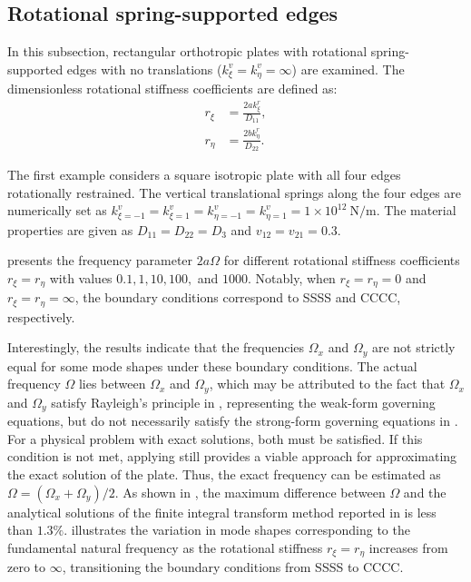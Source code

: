 \documentclass[preprint,12pt,number]{elsarticle}
\newcommand{\ustif}{~\unit{\newton\per\metre}\xspace}
\begin{document}
\subsection{Rotational spring-supported edges}\label{sec:Rotational spring-supported}
In this subsection, rectangular orthotropic plates with rotational spring-supported edges with no translations ($k^v_\xi = k^v_\eta = \infty$) are examined.  
The dimensionless rotational stiffness coefficients are defined as: 
% 
\begin{subequations}\label{eq:rotation_coex}
\begin{align}
	r_{\xi} &= \frac{2a k^r_{\xi}}{D_{11}}, \\
	r_{\eta} &= \frac{2b k^r_{\eta}}{D_{22}}.
\end{align}
\end{subequations}

The first example considers a square isotropic plate with all four edges rotationally restrained. 
The vertical translational springs along the four edges are numerically set as $ k^v_{\xi=-1} = k^v_{\xi=1} = k^v_{\eta=-1} = k^v_{\eta=1} = 1 \times 10^{12} \ustif $. 
The material properties are given as $ D_{11} = D_{22} = D_3 $ and $ v_{12} = v_{21} = 0.3 $.  

 presents the frequency parameter $2a\Omega $ for different rotational stiffness coefficients  $ r_{\xi} = r_{\eta} $ with values $ 0.1, 1, 10, 100, $ and $ 1000$.  
Notably, when $ r_{\xi} = r_{\eta} = 0 $ and $r_{\xi} = r_{\eta} = \infty$, the boundary conditions correspond to SSSS and CCCC, respectively.  

Interestingly, the results indicate that the frequencies $\Omega_x$ and $\Omega_y$ are not strictly equal for some mode shapes under these boundary conditions.  
The actual frequency $\Omega$ lies between $\Omega_x$ and $\Omega_y$, which may be attributed to the fact that $\Omega_x$ and $\Omega_y$ satisfy Rayleigh’s principle in , representing the weak-form governing equations, but do not necessarily satisfy the strong-form governing equations in .
For a physical problem with exact solutions, both  must be satisfied.  
If this condition is not met, applying  still provides a viable approach for approximating the exact solution of the plate.  
Thus, the exact frequency can be estimated as $\Omega = (\Omega_x + \Omega_y)/2$.  
As shown in , the maximum difference between \(\Omega\) and the analytical solutions of the finite integral transform method reported in  is less than $1.3\%$.
 illustrates the variation in mode shapes corresponding to the fundamental natural frequency as the rotational stiffness $r_{\xi} = r_{\eta}$ increases from zero to $\infty$, transitioning the boundary conditions from SSSS to CCCC.
\end{document}
